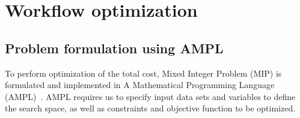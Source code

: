 { %


\newcommand{\INSTANCE}{I}
\newcommand{\STORAGE}{S}
\newcommand{\PROVIDER}{P}
\newcommand{\PROVIDERINSTANCES}{PI}
\newcommand{\LOCALSTORAGE}{LS}

\newcommand{\LAYER}{L}
\newcommand{\TASK}{G}


\newcommand{\instancePrice}{p^I}
\newcommand{\ccu}{ccu}
\newcommand{\instanceTransferPriceIn}{p^{Iin}}
\newcommand{\instanceTransferPriceOut}{p^{Iout}}
\newcommand{\storageTransferPriceOut}{p^{Sout}}
\newcommand{\storageTransferPriceIn}{p^{Sin}}
\newcommand{\transferRate}{r}


\newcommand{\taskCount}{A^{tot}}
\newcommand{\transferTime}{t^{net}}
\newcommand{\execTime}{t^x}
\newcommand{\dataSizeIn}{d^{in}}
\newcommand{\dataSizeOut}{d^{out}}
\newcommand{\requestPrice}{p^{R}}
\newcommand{\workflowDeadline}{t^D}
\newcommand{\instanceDeadline}{t^d}
\newcommand{\unitTime}{t^u}
\newcommand{\transferCost}{c^T}
\newcommand{\tasksPerDeadline}{a^d}
\newcommand{\timeQuantum}{t^q}
\newcommand{\tasksPerTimeQuantum}{a^q}
\newcommand{\providerMaxMachines}{n^{Pmax}}
\newcommand{\instanceMaxMachines}{n^{Imax}}

\newcommand{\NumberInstances}{N}
\newcommand{\TaskAssignment}{A}
\newcommand{\DataAssignment}{D}
\newcommand{\TailTaskHours}{R}
\newcommand{\HasTail}{H}

\newcommand{\instanceSet}{I^{idx}}
\newcommand{\InstanceTasks}{T}
\newcommand{\InstanceHours}{H}
\newcommand{\InstanceActive}{A}           
\newcommand{\LayerDeadline}{D}
\newcommand{\LayerTime}{D^t}

\chapter{Workflow optimization}
\label{chap:formulation-workflows} 

    \section{Problem formulation using AMPL}
    \label{sec:problem}

  
    To perform optimization of the total cost, Mixed Integer Problem (MIP)
    is formulated and implemented in A Mathematical Programming
    Language (AMPL)~\cite{Fourer2002}.  AMPL requires us to specify input data sets
    and variables to define the search space, as well as constraints and
    objective function to be optimized.
    
}
